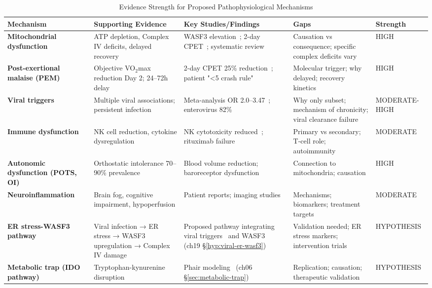 \begin{table}[htbp]
\centering
\caption{Evidence Strength for Proposed Pathophysiological Mechanisms}
\label{tab:pathophysiology-evidence}
\scriptsize
\begin{tabular}{p{3cm}p{3.5cm}p{4cm}p{2cm}p{1.5cm}}
\toprule
\textbf{Mechanism} & \textbf{Supporting Evidence} & \textbf{Key Studies/Findings} & \textbf{Gaps} & \textbf{Strength} \\
\midrule
\textbf{Mitochondrial dysfunction} & ATP depletion, Complex IV deficits, delayed recovery & WASF3 elevation~\cite{wang2023wasf3}; 2-day CPET~\cite{Lim2020}; systematic review~\cite{Syed2025} & Causation vs consequence; specific complex deficits vary & HIGH \\
\midrule
\textbf{Post-exertional malaise (PEM)} & Objective VO$_2$max reduction Day 2; 24--72h delay & 2-day CPET 25\% reduction~\cite{Lim2020}; patient "<5 crash rule" & Molecular trigger; why delayed; recovery kinetics & HIGH \\
\midrule
\textbf{Viral triggers} & Multiple viral associations; persistent infection & Meta-analysis OR 2.0--3.47~\cite{hwang2023viral}; enterovirus 82\%~\cite{Chia2005} & Why only subset; mechanism of chronicity; viral clearance failure & MODERATE-HIGH \\
\midrule
\textbf{Immune dysfunction} & NK cell reduction, cytokine dysregulation & NK cytotoxicity reduced~\cite{Bulbule2024}; rituximab failure~\cite{Fluge2019} & Primary vs secondary; T-cell role; autoimmunity & MODERATE \\
\midrule
\textbf{Autonomic dysfunction (POTS, OI)} & Orthostatic intolerance 70--90\% prevalence & Blood volume reduction; baroreceptor dysfunction & Connection to mitochondria; causation & HIGH \\
\midrule
\textbf{Neuroinflammation} & Brain fog, cognitive impairment, hypoperfusion & Patient reports; imaging studies & Mechanisms; biomarkers; treatment targets & MODERATE \\
\midrule
\textbf{ER stress-WASF3 pathway} & Viral infection → ER stress → WASF3 upregulation → Complex IV damage & Proposed pathway integrating viral triggers~\cite{hwang2023viral} and WASF3~\cite{wang2023wasf3} (ch19 \S\ref{hyp:viral-er-wasf3}) & Validation needed; ER stress markers; intervention trials & HYPOTHESIS \\
\midrule
\textbf{Metabolic trap (IDO pathway)} & Tryptophan-kynurenine disruption & Phair modeling~\cite{phair2019ido} (ch06 \S\ref{sec:metabolic-trap}) & Replication; causation; therapeutic validation & HYPOTHESIS \\
\bottomrule
\end{tabular}
\end{table}

